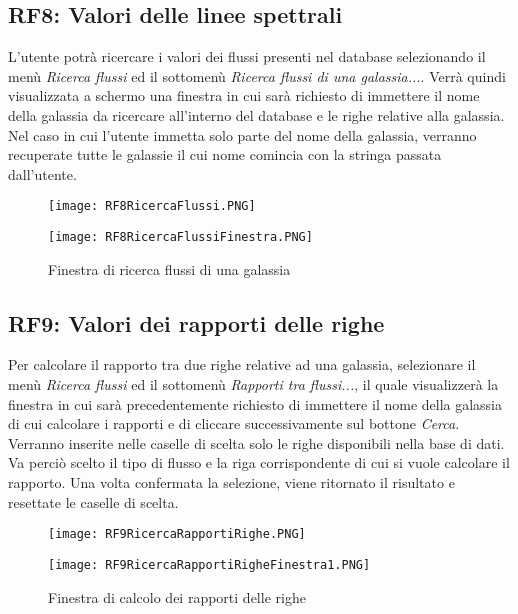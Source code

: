 \documentclass[12pt,a4paper,onecolumn,x11names]{article}
\begin{document}
	\subsection{RF8: Valori delle linee spettrali}
		\begin{flushleft}
			L'utente potrà ricercare i valori dei flussi presenti nel database selezionando il menù \textit{Ricerca flussi} ed il sottomenù \textit{Ricerca flussi di una galassia...}. Verrà quindi visualizzata a schermo una finestra in cui sarà richiesto di immettere il nome della galassia da ricercare all'interno del database e le righe relative alla galassia. Nel caso in cui l'utente immetta solo parte del nome della galassia, verranno recuperate tutte le galassie il cui nome comincia con la stringa passata dall'utente.
		\end{flushleft}
		\begin{figure}[!h]
			\centering
			\begin{minipage}[c]{.45\textwidth}
				\texttt{[image: RF8RicercaFlussi.PNG]}
				\caption{Menù da selezionare per\newline ricercare flussi di una galassia}
			\end{minipage}%
			\centering
			\begin{minipage}[c]{.45\textwidth}
				\texttt{[image: RF8RicercaFlussiFinestra.PNG]}
				\caption{Finestra di ricerca flussi di una galassia}
			\end{minipage}%
		\end{figure}
	\subsection{RF9: Valori dei rapporti delle righe}
		\begin{flushleft}
			Per calcolare il rapporto tra due righe relative ad una galassia, selezionare il menù \textit{Ricerca flussi} ed il sottomenù \textit{Rapporti tra flussi...}, il quale visualizzerà la finestra in cui sarà precedentemente richiesto di immettere il nome della galassia di cui calcolare i rapporti e di cliccare successivamente sul bottone \textit{Cerca}. Verranno inserite nelle caselle di scelta solo le righe disponibili nella base di dati. Va perciò scelto il tipo di flusso e la riga corrispondente di cui si vuole calcolare il rapporto. Una volta confermata la selezione, viene ritornato il risultato e resettate le caselle di scelta.
		\end{flushleft}
		\begin{figure}[!h]
			\centering
			\begin{minipage}[c]{.45\textwidth}
				\texttt{[image: RF9RicercaRapportiRighe.PNG]}
				\caption{Menù da selezionare per\newline ricercare flussi di una galassia}
			\end{minipage}%
			\centering
			\begin{minipage}[c]{.45\textwidth}
				\texttt{[image: RF9RicercaRapportiRigheFinestra1.PNG]}
				\caption{Finestra di calcolo dei rapporti delle righe}
			\end{minipage}%
		\end{figure}
\end{document}
